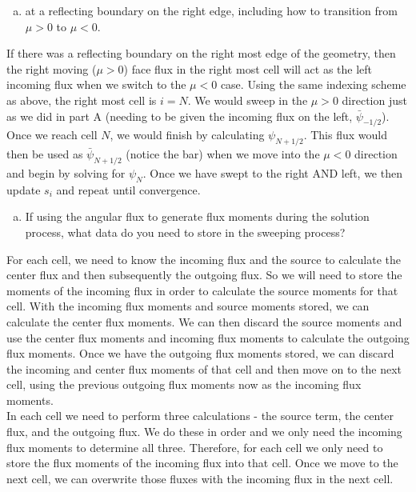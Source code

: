 \documentclass[10pt]{article}
\begin{document}
%
%
%

\vspace{10pt}
\begin{enumerate}[(c)]
\item at a reflecting boundary on the right edge, including how to transition from $\mu > 0$ to $\mu < 0$.
\end{enumerate}

If there was a reflecting boundary on the right most edge of the geometry, then the right moving ($\mu>0$) face flux in the right most cell will act as the left incoming flux when we switch to the $\mu < 0$ case. Using the same indexing scheme as above, the right most cell is $i=N$. We would sweep in the $\mu >0$ direction just as we did in part A (needing to be given the incoming flux on the left, $\bar{\psi}_{-1/2}$). Once we reach cell $N$, we would finish by calculating $\psi_{N+1/2}$. This flux would then be used as $\bar{\psi}_{N+1/2}$ (notice the bar) when we move into the $\mu<0$ direction and begin by solving for $\psi_N$. Once we have swept to the right AND left, we then update $s_i$ and repeat until convergence.

%
%
%

\vspace{10pt}
\begin{enumerate}[(d)]
\item If using the angular flux to generate flux moments during the solution process, what data do you need to store in the sweeping process?
\end{enumerate}

For each cell, we need to know the incoming flux and the source to calculate the center flux and then subsequently the outgoing flux. So we will need to store the moments of the incoming flux in order to calculate the source moments for that cell. With the incoming flux moments and source moments stored, we can calculate the center flux moments. We can then discard the source moments and use the center flux moments and incoming flux moments to calculate the outgoing flux moments. Once we have the outgoing flux moments stored, we can discard the incoming and center flux moments of that cell and then move on to the next cell, using the previous outgoing flux moments now as the incoming flux moments.\\

In each cell we need to perform three calculations - the source term, the center flux, and the outgoing flux. We do these in order and we only need the incoming flux moments to determine all three. Therefore, for each cell we only need to store the flux moments of the incoming flux into that cell. Once we move to the next cell, we can overwrite those fluxes with the incoming flux in the next cell.
\end{document}
